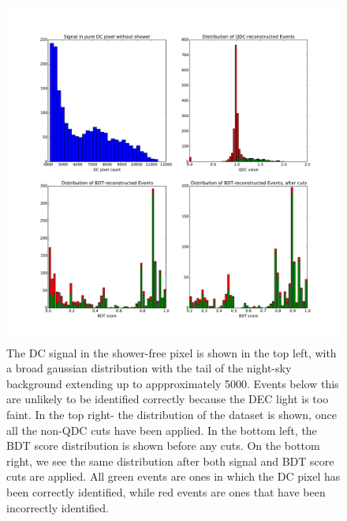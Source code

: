 \documentclass{article}
\begin{document}
\begin{figure}
\begin{center}
\includegraphics[width=\textwidth]{cutdistribution}
\caption{The DC signal in the shower-free pixel is shown in the top left, with a broad gaussian distribution with the tail of the night-sky background extending up to appproximately 5000. Events below this are unlikely to be identified correctly because the DEC light is too faint. In the top right- the distribution of the dataset is shown, once all the non-QDC cuts have been applied. In the bottom left, the BDT score distribution is shown before any cuts. On the bottom right, we see the same distribution after both signal and BDT score cuts are applied. All green events are ones in which the DC pixel has been correctly identified, while red events are ones that have been incorrectly identified.}
\label{fig:cutdistribution}
\end{center}
\end{figure} 
\end{document}
